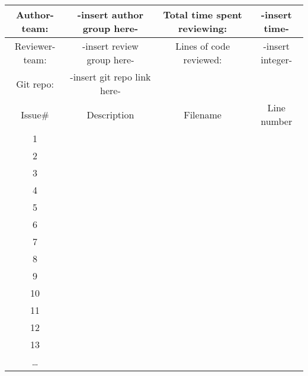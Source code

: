 \begin{table}
\begin{tabular}{|c|c|c|c|}
\hline
Author-team: & -insert author group here- & Total time spent reviewing: &
-insert time- \\ \hline
Reviewer-team: & -insert review group here- & Lines of code reviewed:& -insert
integer-\\ \hline
Git repo: & -insert git repo link here- && \\ \hline
Issue\# & Description & Filename & Line number\\ \hline
1 &&& \\ \hline
2 &&& \\ \hline
3 &&& \\ \hline
4 &&& \\ \hline
5 &&& \\ \hline
6 &&& \\ \hline
7&&& \\ \hline
8&&& \\ \hline
9&&& \\ \hline
10&&& \\ \hline
11&&& \\ \hline
12&&& \\ \hline
13&&& \\ \hline
\ldots &&& \\ \hline
\end{tabular}
\end{table}
